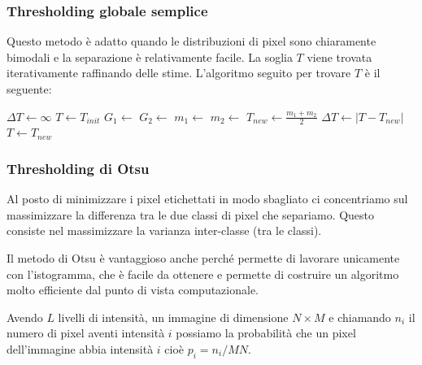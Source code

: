 \subsubsection{Thresholding globale semplice}
Questo metodo è adatto quando le distribuzioni di pixel sono chiaramente bimodali e la separazione è relativamente facile. La soglia $T$ viene trovata iterativamente raffinando delle stime. L'algoritmo seguito per trovare $T$ è il seguente:
\vspace{.5cm}

\begin{algorithmic}
		\State $\Delta T \gets \infty$
		\State $T \gets T_{init}$
			\State $G_1 \gets$ 
			\State $G_2 \gets$ 
			\State $m_1 \gets$ 
			\State $m_2 \gets$ 
			\State $T_{new} \gets \frac{m_1 + m_2}{2}$
			\State $\Delta T \gets |T - T_{new}|$
			\State $T \gets T_{new}$
		\EndWhile
	\EndFunction    
\end{algorithmic}

\subsubsection{Thresholding di Otsu}
Al posto di minimizzare i pixel etichettati in modo sbagliato ci concentriamo sul massimizzare la differenza tra le due classi di pixel che separiamo. Questo consiste nel massimizzare la varianza inter-classe (tra le classi).

Il metodo di Otsu è vantaggioso anche perché permette di lavorare unicamente con l'istogramma, che è facile da ottenere e permette di costruire un algoritmo molto efficiente dal punto di vista computazionale.

Avendo $L$ livelli di intensità, un immagine di dimensione $N\times M$ e chiamando $n_i$ il numero di pixel aventi intensità $i$ possiamo la probabilità che un pixel dell'immagine abbia intensità $i$ cioè $p_i = n_i/MN$.

